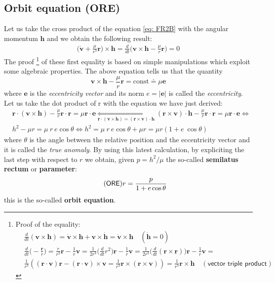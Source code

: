 \subsection{Orbit equation (ORE)}
Let us take the cross product of the equation \ref{eq: FR2B} with the angular momentum $\mathbf{h}$ and we obtain the following result:
{\large{
    \begin{align*}
        \biggl(
            \dot{\mathbf{v}} +  \frac{\mu}{r^3}\mathbf{r}
        \biggr) \times \mathbf{h} = 
        \frac{d}{dt}\biggl(
            \mathbf{v} \times \mathbf{h} - \frac{\mu}{r}\mathbf{r}
        \biggr)=0
    \end{align*}
}}
The proof
\footnote[8]{Proof of the equality: \begin{align*}
    &\frac{d}{dt}(\mathbf{v}\times\mathbf{h}) = \dot{\mathbf{v}}\times\mathbf{h} + \mathbf{v} \times \dot{\mathbf{h}}= \mathbf{\dot{v}} \times \mathbf{h} \quad (\dot{\mathbf{h}}=0) \\
    &\frac{d}{dt}\biggl(
        -\frac{\mathbf{r}}{r}
    \biggr) = \frac{\dot{r}}{r^2} \mathbf{r} - \frac{1}{r}\mathbf{v} = \frac{1}{2r^3}\biggl(
        \frac{d}{dt} r^2
    \biggr) \mathbf{r} - \frac{1}{r}\mathbf{v} = \frac{1}{2r^3}\biggl(
        \frac{d}{dt} (\mathbf{r} \times \mathbf{r})
    \biggr) \mathbf{r} - \frac{1}{r}\mathbf{v}=\\
    &\frac{1}{r^3} ((\mathbf{r} \cdot \mathbf{v})\mathbf{r}-(\mathbf{r} \cdot \mathbf{v})\times \mathbf{v}=\frac{1}{r^3}\mathbf{r}\times(\mathbf{r}\times\mathbf{v}))=\frac{1}{r^3}\mathbf{r}\times\mathbf{h} \quad (\textsf{vector triple product})
\end{align*}}
of these first equality is based on simple manipulations which exploit some algebraic properties.
The above equation tells us that the quantity
$$
\mathbf{v} \times \mathbf{h} - \frac{\mu}{r}\mathbf{r}=\text{const} \doteq \mu\mathbf{e}
$$
where $\mathbf{e}$ is the \textit{eccentricity vector} and its norm $e=\vert \mathbf{e} \vert$ is called the \textit{eccentricity}. Let us take the dot product of r with the equation we have just derived:
\begin{align*}
    &\mathbf{r}\cdot (\mathbf{v} \times \mathbf{h}) - \frac{\mu}{r}\mathbf{r}\cdot\mathbf{r}=\mu\mathbf{r}\cdot\mathbf{e} \underset{\mathbf{r}\cdot (\mathbf{v} \times \mathbf{h})=(\mathbf{r}\times\mathbf{v})\cdot \mathbf{h}}{\iff} 
    (\mathbf{r}\times\mathbf{v})\cdot \mathbf{h} - \frac{\mu}{r}\mathbf{r}\cdot\mathbf{r}=\mu\mathbf{r}\cdot\mathbf{e}\iff\\
    &h^2 - \mu r = \mu \ r \ e \cos\theta \iff 
    h^2 = \mu \ r \ e \cos\theta + \mu r = \mu r(1+e \ \cos\theta)
\end{align*}
where $\theta$ is the angle between the relative position and the eccentricity vector and it is called the \textit{true anomaly}. By using this latest calculation, by expliciting the last step with respect to $r$ we obtain, given $p=h^2/\mu$ the so-called \textbf{semilatus rectum} or \textbf{parameter}:
{\large{
    \begin{equation} \tag{\textsf{ORE}} \label{eq:ORE}
        r = \frac{p}{1+e \cos\theta}
    \end{equation}
}}
this is the so-called \textbf{orbit equation}.



